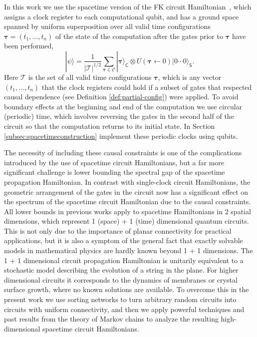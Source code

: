 \documentclass[11pt,letterpaper]{article}
\theoremstyle{definition}
\theoremstyle{remark}
\numberwithin{equation}{section}
\theoremstyle{definition}
\newcommand{\ket}[1]{|#1\rangle}
\newcommand{\sC}{{\mathsf{C}}}
\newcommand{\sS}{{\mathsf{S}}}
\begin{document}
In this work we use the spacetime version of the FK circuit Hamiltonian~\cite{breuckmann2014space}, which assigns a clock register to each computational qubit, and has a ground space spanned by uniform superposition over all valid time configurations $\boldsymbol{\tau} = (t_1,...,t_n)$ of the state of the computation after the gates prior to $\boldsymbol{\tau}$ have been performed, 
\begin{equation}
  \ket{\psi} = \frac{1}{|\mathcal{T}|^{1/2}} \sum_{\boldsymbol{\tau} \in \mathcal{C}} \ket{\boldsymbol{\tau}}_{\sC} \otimes U(\boldsymbol{\tau} \leftarrow 0)\ket{0 \cdots 0}_{\sS}.
\end{equation}
Here $\mathcal{T}$ is the set of all valid time configurations $\boldsymbol{\tau}$, which is any vector $(t_1, \ldots, t_n)$ that the clock registers could hold if a subset of gates that respected causal dependence (see Definition \ref{def:partial-config}) were applied.  To avoid boundary effects at the beginning and end of the computation we use circular (periodic) time, which involves reversing the gates in the second half of the circuit so that the computation returns to its initial state.  In Section \ref{subsec:spacetimeconstruction} implement these periodic clocks using qubits.  
%

The necessity of including these causal constraints is one of the complications introduced by the use of spacetime circuit Hamiltonians, but a far more significant challenge is lower bounding the spectral gap of the spacetime propagation Hamiltonian.  In contrast with single-clock circuit Hamiltonians, the geometric arrangement of the gates in the circuit now has a significant effect on the spectrum of the spacetime circuit Hamiltonian due to the causal constraints.  All lower bounds in previous works apply to spacetime Hamiltonians in 2 spatial dimensions, which represent 1 (space) + 1 (time) dimensional quantum circuits.  This is not only due to the importance of planar connectivity for practical applications, but it is also a symptom of the general fact that exactly solvable models in mathematical physics are hardly known beyond 1 + 1 dimensions.   The 1 + 1 dimensional circuit propagation Hamiltonian is unitarily equivalent to a stochastic model describing the evolution of a string in the plane.  For higher dimensional circuits it corresponds to the dynamics of membranes or crystal surface growth, where no known solutions are available.  To overcome this in the present work we use sorting networks to turn arbitrary random circuits into circuits with uniform connectivity, and then we apply powerful techniques and past results from the theory of Markov chains to analyze the resulting high-dimensional spacetime circuit Hamiltonians.  
 
\end{document}
